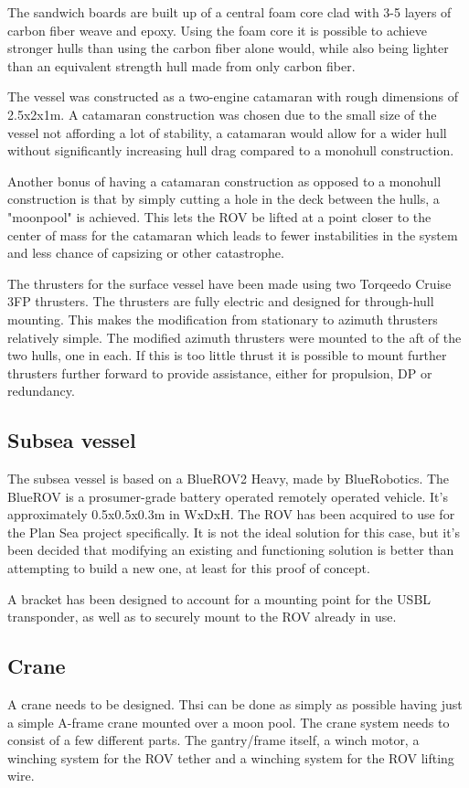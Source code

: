 \documentclass[class=article, crop=false]{standalone}
\begin{document}
The sandwich boards are built up of a central foam core clad with 3-5 layers of carbon fiber weave and epoxy. Using the foam core it is possible to achieve stronger hulls than using the carbon fiber alone would, while also being lighter than an equivalent strength hull made from only carbon fiber.

The vessel was constructed as a two-engine catamaran with rough dimensions of 2.5x2x1m. A catamaran construction was chosen due to the small size of the vessel not affording a lot of stability, a catamaran would allow for a wider hull without significantly increasing hull drag compared to a monohull construction.

Another bonus of having a catamaran construction as opposed to a monohull construction is that by simply cutting a hole in the deck between the hulls, a "moonpool" is achieved. This lets the ROV be lifted at a point closer to the center of mass for the catamaran which leads to fewer instabilities in the system and less chance of capsizing or other catastrophe.

The thrusters for the surface vessel have been made using two Torqeedo Cruise 3FP thrusters. The thrusters are fully electric and designed for through-hull mounting. This makes the modification from stationary to azimuth thrusters relatively simple. The modified azimuth thrusters were mounted to the aft of the two hulls, one in each. If this is too little thrust it is possible to mount further thrusters further forward to provide assistance, either for propulsion, DP or redundancy.


\subsection{Subsea vessel}
The subsea vessel is based on a BlueROV2 Heavy, made by BlueRobotics. The BlueROV is a prosumer-grade battery operated remotely operated vehicle. It's approximately 0.5x0.5x0.3m in WxDxH. The ROV has been acquired to use for the Plan Sea project specifically. It is not the ideal solution for this case, but it's been decided that modifying an existing and functioning solution is better than attempting to build a new one, at least for this proof of concept.

A bracket has been designed to account for a mounting point for the USBL transponder, as well as to securely mount to the ROV already in use.

\subsection{Crane}
A crane needs to be designed. Thsi can be done as simply as possible having just a simple A-frame crane mounted over a moon pool. The crane system needs to consist of a few different parts. The gantry/frame itself, a winch motor, a winching system for the ROV tether and a winching system for the ROV lifting wire.
\end{document}
